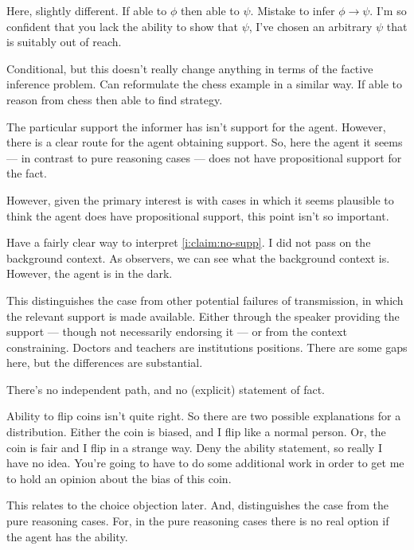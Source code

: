 \documentclass[10pt]{article}
\newcommand{\hozlinedash}[0]{%
  \noindent\hdashrule[0.5ex][c]{\textwidth}{.1pt}{2.5pt}
}
\begin{document}
\hozlinedash


\begin{note}
  Here, slightly different.
  If able to \(\phi\) then able to \(\psi\).
  Mistake to infer \(\phi \rightarrow \psi\).
  I'm so confident that you lack the ability to show that \(\psi\), I've chosen an arbitrary \(\psi\) that is suitably out of reach.

  Conditional, but this doesn't really change anything in terms of the factive inference problem.
  Can reformulate the chess example in a similar way.
  If able to reason from chess then able to find strategy.
\end{note}

The particular support the informer has isn't support for the agent.
However, there is a clear route for the agent obtaining support.
So, here the agent it seems --- in contrast to pure reasoning cases --- does not have propositional support for the fact.

However, given the primary interest is with cases in which it seems plausible to think the agent does have propositional support, this point isn't so important.

Have a fairly clear way to interpret \ref{i:claim:no-supp}.
I did not pass on the background context.
As observers, we can see what the background context is.
However, the agent is in the dark.

This distinguishes the case from other potential failures of transmission, in which the relevant support is made available.
Either through the speaker providing the support --- though not necessarily endorsing it --- or from the context constraining.
Doctors and teachers are institutions positions.
There are some gaps here, but the differences are substantial.

There's no independent path, and no (explicit) statement of fact.

Ability to flip coins isn't quite right.
So there are two possible explanations for a distribution.
Either the coin is biased, and I flip like a normal person.
Or, the coin is fair and I flip in a strange way.
Deny the ability statement, so really I have no idea.
You're going to have to do some additional work in order to get me to hold an opinion about the bias of this coin.

{
  \color{red}
  This relates to the choice objection later.
  And, distinguishes the case from the pure reasoning cases.
  For, in the pure reasoning cases there is no real option if the agent has the ability.
}
\end{document}
